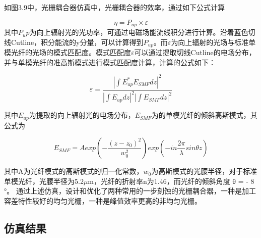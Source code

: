 如图3.9中，光栅耦合器仿真中，光栅耦合器的效率，通过如下公式计算

\begin{equation}
\eta= P_{up}\times \varepsilon
\end{equation}
其中$P_up$为向上辐射光的光功率，可通过电磁场能流线积分进行计算。沿着蓝色切线Cutline，积分能流的y分量，可以计算得到$P_{up}$。而$\varepsilon$为向上辐射的光场与标准单模光纤的光场的模式匹配度。模式匹配度$\varepsilon$可以通过提取切线Cutline的电场分布，并与单模光纤的准高斯模式进行模式匹配度计算，计算的公式如下：

\begin{equation}
\varepsilon= \frac{|\int{E_{up}^* E_{SMF}dz}|^2}{|\int{E_{up}dz}|^2| \int{E_{SMF}dz}|^2} 
\end{equation}

其中$E_{up}$为提取的向上辐射光的电场分布，$E_{SMF}$为的单模光纤的倾斜高斯模式，其公式为

\begin{equation}
E_{SMF}=A exp \left(-\frac{(z-z_0)^2}{w_0^2}\right)  exp \left(-in\frac{2\pi}{\lambda} sin \theta z \right)
\end{equation}

其中A为光纤模式的高斯模式的归一化常数，$w_0$为高斯模式的光腰半径，对于标准单模光纤，光腰半径为5.2$\mu$m，光纤的折射率n为1.46，而光纤的倾斜角度
θ = - 8 °。
通过上述仿真，设计和优化了两种常用的一步刻蚀的光栅耦合器，一种是加工容差特性较好的均匀光栅，一种是峰值效率更高的非均匀光栅。

\subsection{仿真结果}

